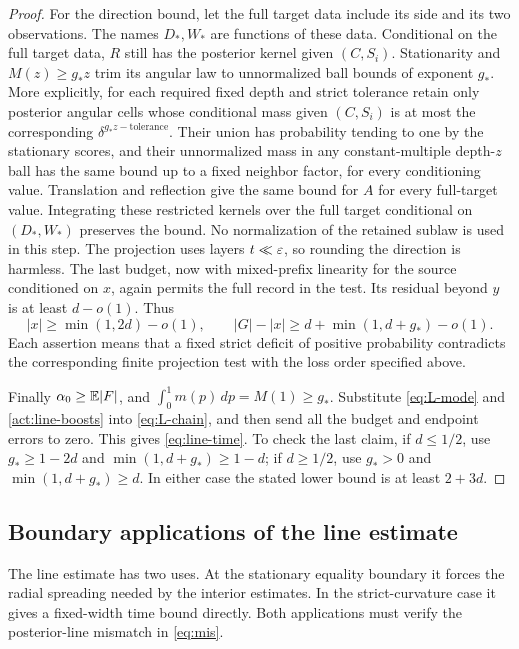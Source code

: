 \begin{proof}
For the direction bound, let the full target data include its
side and its two observations.  The names $D_*,W_*$ are functions
of these data.  Conditional on the full target data, $R$ still has
the posterior kernel given $(C,S_i)$.  Stationarity and
$M(z)\ge g_*z$ trim its angular law to unnormalized ball bounds
of exponent $g_*$.  More explicitly, for each required fixed depth
and strict tolerance retain only posterior angular cells whose
conditional mass given $(C,S_i)$ is at most the corresponding
$\delta^{g_*z-\text{tolerance}}$.  Their union has probability
tending to one by the stationary scores, and their unnormalized
mass in any constant-multiple depth-$z$ ball has the same bound
up to a fixed neighbor factor, for every conditioning value.
Translation and reflection give the same bound for $A$ for every
full-target value.  Integrating these restricted kernels over
the full target conditional on $(D_*,W_*)$ preserves the bound.
No normalization of the retained sublaw is used in this step.
The projection uses layers $t\ll\varepsilon$, so rounding
the direction is harmless.  The last budget, now with mixed-prefix
linearity for the source conditioned on $x$, again permits the full
record in the test.  Its residual beyond $y$ is at least $d-o(1)$.
Thus
\begin{equation}\label{act:line-boosts}
 |x|\ge\min(1,2d)-o(1),\qquad
 |G|-|x|\ge d+\min(1,d+g_*)-o(1).
\end{equation}
Each assertion means that a fixed strict deficit of positive
probability contradicts the corresponding finite projection test
with the loss order specified above.

Finally $\alpha_0\ge\mathbb E|F|$, and
$\int_0^1m(p)\,dp=M(1)\ge g_*$.  Substitute
\eqref{eq:L-mode} and \eqref{act:line-boosts} into
\eqref{eq:L-chain}, and then send all the budget and endpoint errors
to zero.  This gives \eqref{eq:line-time}.  To check the last claim,
if $d\le1/2$, use $g_*\ge1-2d$ and
$\min(1,d+g_*)\ge1-d$; if $d\ge1/2$, use $g_*>0$ and
$\min(1,d+g_*)\ge d$.  In either case the stated lower bound is
at least $2+3d$.
\end{proof}

\subsection{Boundary applications of the line estimate}

The line estimate has two uses. At the stationary equality boundary it
forces the radial spreading needed by the interior estimates. In the
strict-curvature case it gives a fixed-width time bound directly. Both
applications must verify the posterior-line mismatch in \eqref{eq:mis}.

